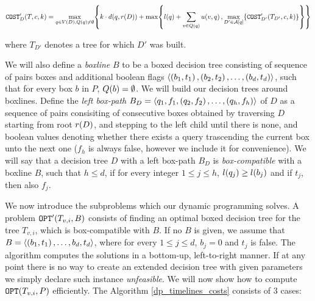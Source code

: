 $$
\texttt{COST}'_D\mathopen{}\left( T,c,k \right)= \max_{q\in V\mathopen{}\left( D \right), Q\mathopen{}\left( q \right)\neq \emptyset}\mathopen{}\left\{ k\cdot d\mathopen{}\left( q,r\mathopen{}\left( D \right) \right)+\max\mathopen{}\left\{ l\mathopen{}\left( q \right)+\sum_{v\in Q\mathopen{}\left( q \right)}u\mathopen{}\left( v,q \right), \max_{D'\in \mathcal{A}[q]}\mathopen{}\left\{ \texttt{COST}'_{D'}\mathopen{}\left( T_{D'},c,k \right) \right\} \right\} \right\}
$$

where $T_{D'}$ denotes a tree for which $D'$ was built.

We will also define a \textit{boxline} $B$ to be a boxed decision tree consisting of sequence of pairs boxes and additional boolean flags $\mathopen{}\langle \mathopen{}\left( b_1, t_1 \right),\mathopen{}\left( b_2, t_2 \right),\dots, \mathopen{}\left( b_d, t_d \right) \rangle$, such that for every box $b$ in $P$, $Q\mathopen{}\left( b \right)=\emptyset$. We will build our decision trees around boxlines. Define the \textit{left box-path} $B_D=\mathopen{}\langle {q_1, f_1},\mathopen{}\left( q_2, f_2 \right),\dots, \mathopen{}\left( q_h, f_h \right) \rangle$ of $D$ as a sequence of pairs consisiting of consecutive boxes obtained by traversing $D$ starting from root $r\mathopen{}\left( D \right)$, and stepping to the left child until there is none, and boolean values denoting whether there exists a query trascending the current box unto the next one ($f_h$ is always false, however we include it for convenience). We will say that a decision tree $D$ with a left box-path $B_D$ is \textit{box-compatible} with a boxline $B$, such that $h\leq d$, if for every integer $1\leq j \leq h$, $l\mathopen{}\left( q_j \right)\geq l\mathopen{}\left( b_j \right)$ and if $t_j$, then also $f_j$.



We now introduce the subproblems which our dynamic programming solves. A problem $\texttt{OPT}'\mathopen{}\left( T_{v,i},B \right)$ consists of finding an optimal boxed decision tree for the tree $T_{v,i}$, which is box-compatible with $B$. If no $B$ is given, we assume that $B=\mathopen{}\langle \mathopen{}\left( b_1,t_1 \right),\dots, {b_d,t_d} \rangle$, where for every $1\leq j\leq d$, $b_j=0$ and $t_j$ is false.
 The algorithm computes the solutions in a bottom-up, left-to-right manner. If at any point there is no way to create an extended decision tree with given parameters we simply declare such instance \textit{unfeasible}. We will now show how to compute $\texttt{OPT}\mathopen{}\left( T_{v,i}, P \right)$ efficiently. The Algorithm \ref{dp_timelines_costs} consists of 3 cases:

 
